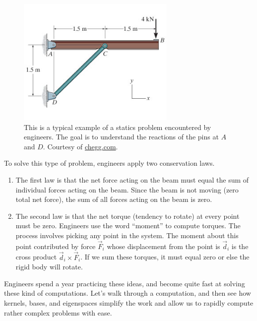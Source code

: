 \begin{figure}
\begin{center}
 \includegraphics[width=3in]{beam.png}
\end{center}
\caption{
This is a typical example of a statics problem encountered by engineers. The goal is to understand the reactions of the pins at $A$ and $D$. \label{statics figure} Courtesy of \href{http://www.chegg.com/homework-help/questions-and-answers/draw-free-body-diagram-beam-determine-horizontal-vertical-components-beam-determine-magnit-q2963278}{chegg.com}. }
\end{figure}

To solve this type of problem, engineers apply two conservation laws.
\begin{enumerate}
 \item The first law is that the net force acting on the beam must equal the sum of individual forces acting on the beam. Since the beam is not moving (zero total net force), the sum of all forces acting on the beam is zero.  
 \item The second law is that the net torque (tendency to rotate) at every point must be zero.  Engineers use the word ``moment'' to compute torques. The process involves picking any point in the system. The moment about this point contributed by force $\vec F_i$ whose displacement from the point is $\vec d_i$ is the cross product $\vec d_i\times \vec F_i$. If we sum these torques, it must equal zero or else the rigid body will rotate.  
\end{enumerate}
Engineers spend a year practicing these ideas, and become quite fast at solving these kind of computations.  Let's walk through a computation, and then see how kernels, bases, and eigenspaces simplify the work and allow us to rapidly compute rather complex problems with ease.


